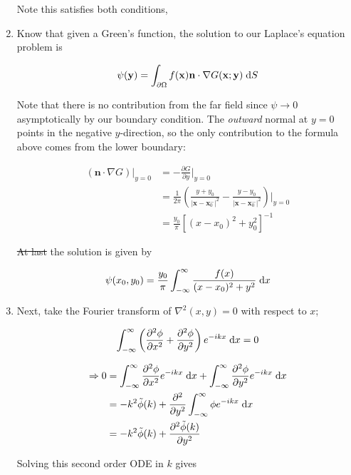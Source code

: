 \documentclass[a4paper]{article}
\begin{document}
\begin{enumerate}
	Note this satisfies both conditions,
	
	\item Know that given a Green's function, the solution to our Laplace's equation problem is
	
	\[ \psi(\mathbf{y}) = \int_{\partial \Omega} f(\mathbf{x}) \mathbf{n} \cdot \nabla G(\mathbf{x} ; \mathbf{y}) \; \mathrm{d} S  \]
	
	
	Note that there is no contribution from the far field since $ \psi \to 0 $ asymptotically by our boundary condition. The \emph{outward} normal at $ y = 0 $ points in the negative $ y $-direction, so the only contribution to the formula above comes from the lower boundary:
	
	\begin{align*}
	(\mathbf{n} \cdot \nabla G )|_{y = 0} & = - \frac{\partial G }{\partial y} \Big|_{y = 0} \\
	& = \frac{1}{2\pi} \left(  \frac{y + y_{0}}{| \mathbf{x} - \mathbf{x}_{0}^{-} |^{2}} - \frac{y - y_{0}}{| \mathbf{x} - \mathbf{x}_{0}^{-} |^{2}} \right) \Big|_{y = 0} \\
	& = \frac{y_{0}}{\pi} [  (x - x_{0})^{2} + y_{0}^{2}   ]^{-1}
	\end{align*}
	
	\st{At last} the solution is given by
	
	\[ \psi(x_{0},y_{0}) = \frac{y_{0}}{\pi} \int_{-\infty}^{\infty} \frac{f(x)}{(x - x_{0})^{2} + y^{2} } \; \mathrm{d} x \]
	
	\item Next, take the Fourier transform of $ \nabla^{2}(x,y) = 0 $ with respect to $ x $;
	
	\[ \int_{-\infty}^{\infty} \left(  \frac{\partial^{2} \phi }{\partial x^{2}} + \frac{\partial^{2} \phi }{\partial y^{2}} \right) e^{-ikx} \; \mathrm{d} x = 0  \]
	
	\begin{align*}
	\Rightarrow 0 & = \int_{-\infty}^{\infty}  \frac{\partial^{2} \phi }{\partial x^{2}}  e^{-ikx} \; \mathrm{d} x  + \int_{-\infty}^{\infty} \frac{\partial^{2} \phi }{\partial y^{2}} e^{-ikx} \; \mathrm{d} x\\
	& = - k^{2} \tilde{\phi}(k) + \frac{\partial^{2} }{\partial y^{2}} \int_{-\infty}^{\infty}  \phi e^{- i k x} \; \mathrm{d} x\\
	& = - k^{2} \tilde{\phi}(k) +  \frac{\partial^{2} \tilde{\phi}(k) }{\partial y^{2}}
	\end{align*}
	
	Solving this second order ODE in $ k $ gives
	

\end{enumerate}
\end{document}
